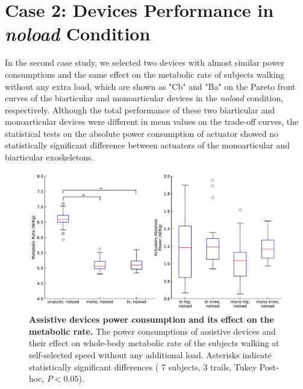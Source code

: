 \documentclass[10pt,letterpaper]{article}
\begin{document}
\section*{Case 2: Devices Performance in \textit{\textit{noload}} Condition}
In the second case study, we selected two devices with almost similar power consumptions and the same effect on the metabolic rate of subjects walking without any extra load, which are shown as "Cb" and "Ba" on the Pareto front curves of the biarticular and monoarticular devices in the {\it noload} condition, respectively. Although the total performance of these two biarticular and monoarticular devices were different in mean values on the trade-off curves, the statistical tests on the absolute power consumption of actuator showed no statistically significant difference between actuators of the monoarticular and biarticular exoskeletons.\\
\begin{figure}[ht]   
	\centering
	\includegraphics[width=\linewidth]{Case_Studies/NoloadMono06_NoloadBi12/PaperFigure_BoxPlot.pdf}
	\vspace{1mm}
	\caption{\small{\textbf{Assistive devices power consumption and its effect on the metabolic rate.} The power consumptions of assistive devices and their effect on whole-body metabolic rate of the subjects walking at self-selected speed without any additional load. Asterisks indicate statistically significant differences ( 7 subjects, 3 trails, Tukey Post-hoc, $P < 0.05$).}}
	\label{Fig_Case02_Energy_Plot}
\end{figure}
\end{document}
